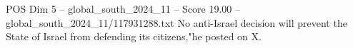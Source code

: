 \begin{textsample}{POS Dim 5 – global\_south\_2024\_11 – Score 19.00 – global\_south\_2024\_11/117931288.txt}
No anti-Israel decision will prevent the State of Israel from defending its citizens,"he posted on X.

\end{textsample}
